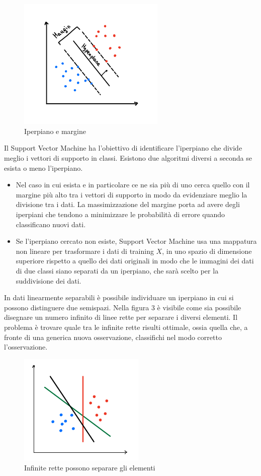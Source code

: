 \documentclass[12pt,italian]{report}
\begin{document}
\begin{figure}[h]
	\centering
	\includegraphics[width = 70mm]{immagini/marginEhiperplane}
	\caption{Iperpiano e margine}
\end{figure}

Il Support Vector Machine ha l'obiettivo di identificare l'iperpiano che divide meglio i vettori di supporto in classi. Esistono due algoritmi diversi a seconda se esista o meno l'iperpiano.

\begin{itemize}
	\item Nel caso in cui esista e in particolare ce ne sia più di uno cerca quello con il margine più alto tra i vettori di supporto in modo da evidenziare meglio la divisione tra i dati. La massimizzazione del margine porta ad avere degli iperpiani che tendono a minimizzare le probabilità di errore quando classificano nuovi dati. 
	\item Se l'iperpiano cercato non esiste, Support Vector Machine usa una mappatura non lineare per trasformare i dati di training $X$, in uno spazio di dimensione superiore rispetto a quello dei dati originali in modo che le immagini dei dati di due classi siano separati da un iperpiano, che sarà scelto per la suddivisione dei dati. 
\end{itemize}

In dati linearmente separabili è possibile individuare un iperpiano in cui si possono distinguere due semispazi. Nella figura 3 è visibile come sia possibile disegnare un numero infinito di linee rette per separare i diversi elementi. Il problema è trovare quale tra le infinite rette risulti ottimale, ossia quella che, a fronte di una generica nuova osservazione, classifichi nel modo corretto l'osservazione.

\begin{figure}[h]
	\centering
	\includegraphics[width = 60mm]{immagini/linearmente-separabili}
	\caption{Infinite rette possono separare gli elementi}
\end{figure}
\end{document}
